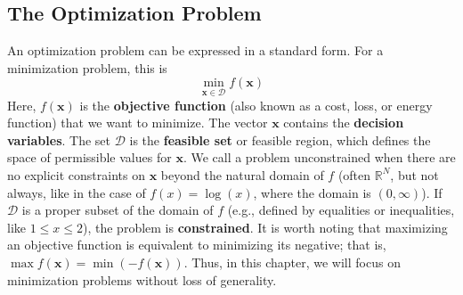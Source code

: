 \subsection{The Optimization Problem}
An optimization problem can be expressed in a standard form. For a minimization problem, this is
\begin{equation}
    \min_{\mathbf{x} \in \mathcal{D}} f(\mathbf{x})
\end{equation}
Here, $f(\mathbf{x})$ is the \textbf{objective function} (also known as a cost, loss, or energy function) that we want to minimize. The vector $\mathbf{x}$ contains the \textbf{decision variables}. The set $\mathcal{D}$ is the \textbf{feasible set} or feasible region, which defines the space of permissible values for $\mathbf{x}$. We call a problem unconstrained when there are no explicit constraints on $\mathbf{x}$ beyond the natural domain of $f$ (often $\mathbb{R}^N$, but not always, like in the case of $f(x) = \log(x)$, where the domain is $(0,\infty)$). If $\mathcal{D}$ is a proper subset of the domain of $f$ (e.g., defined by equalities or inequalities, like $1 \le x \le 2$), the problem is \textbf{constrained}. It is worth noting that maximizing an objective function is equivalent to minimizing its negative; that is, $\max f(\mathbf{x}) = \min\left( -f(\mathbf{x}) \right)$. Thus, in this chapter, we will focus on minimization problems without loss of generality.

